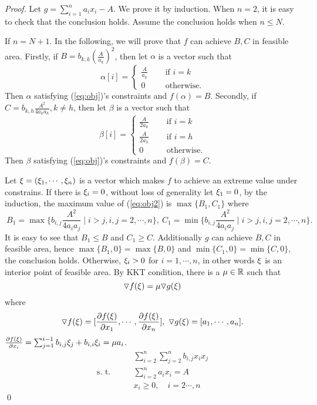 \documentclass{llncs}
\begin{document}
\begin{proof}
	Let $g=\sum_{i=1}^na_ix_i-A$.
	We prove it by induction. When $n=2$, it is easy to check that the conclusion holds. Assume the conclusion holds
	when $n\le N$.
	
	If $n=N+1$.   In the following, we will prove that $f$ can achieve   $B,C$ in feasible area. Firstly, if $B=b_{k,k}\left(\frac{A}{a_{k}}\right)^2$, then let $\alpha$ is a vector such that 
	\[\alpha[i]=\begin{cases}
	\frac{A}{a_k}       & \quad   \text{ if  } i=k\\
	0  & \quad \text{ otherwise.}
	\end{cases} 	\]	
	 Then $\alpha$ satisfying (\ref{eq:obj})'s constraints and $f(\alpha)=B$. Secondly, if $C=b_{k,h}\frac{A^2}{4a_{k}a_{h}}, k\neq h$,
	 then let $\beta$  is a vector such that 
	 	\[\beta[i]=\begin{cases}
	 	\frac{A}{2a_k}       & \quad   \text{ if  } i=k\\
	 	\frac{A}{2a_h}       & \quad   \text{ if  } i=h\\
	 	0  & \quad \text{ otherwise.}
	 	\end{cases} 
	 	\]	
	  Then $\beta$ satisfying (\ref{eq:obj})'s constraints and $f(\beta)=C$.	
	
	  Let ${\mathbf{\xi}}=({\mathbf{\xi}}_1,\cdots, {\mathbf{\xi}}_n)$ is a vector which makes $f$ to  achieve an extreme  value under constrains.  If there is ${\mathbf{\xi}}_i=0$, 
	  without loss of generality let ${\mathbf{\xi}}_1=0$, by the induction, the maximum value of (\ref{eq:obj2}) is $\max\{ B_1, C_1\}$
	  where 
	   \[\ B_1=\max\{b_{i,j}\frac{A^2}{4a_{i}a_{j}}  \mid i> j, i,j=2,\cdots,n \},
	   \ C_1=\min\{b_{i,j}\frac{A^2}{4a_{i}a_{j}}  \mid i> j, i,j=2,\cdots,n \}.\] 
	   It is easy to see that $B_1\le B$ and $C_1\ge C$. Additionally $g$ can  achieve $B,C$ in feasible area, hence $\max\{ B_1, 0\}=\max\{ B, 0\}　$ and $\min\{ C_1, 0\}=\min\{ C, 0\}　$, the conclusion holds.  Otherwise, ${\mathbf{\xi}}_i>0$ for $i=1,\cdots, n$, in other words ${\mathbf{\xi}}$ is an interior point of feasible area. By  KKT condition, there is a $\mu\in \mathbb{R}$ such that  
	   \[\triangledown f({\mathbf{\xi}}) = \mu\triangledown g({\mathbf{\xi}})  \]
	   where \[\triangledown f({\mathbf{\xi}})=[\frac{\partial f({\mathbf{\xi}})}{\partial x_1},\cdots, \frac{\partial f({\mathbf{\xi}})}{\partial x_n}], \ \triangledown g({\mathbf{\xi}})=[a_1,\cdots, a_n].\]
	   $\frac{\partial f({\mathbf{\xi}})}{\partial x_i}=\sum_{j=1}^{i-1}b_{i,j}{\mathbf{\xi}}_j+b_{i,i}{\mathbf{\xi}}_i=\mu a_i$.
	  	\begin{align}
	  	&\sum_{i=2}^n\sum_{j=2}^nb_{i,j}x_{i}x_{j}  \label{eq:obj2}\\
	  	\mbox{s.\ t.}\qquad	&\sum_{i=2}^na_ix_i=A \nonumber\\
	  	& x_i\ge 0,\quad i=2\cdots,n \nonumber
	  	\end{align}
\qed	
\end{proof}
\end{document}

